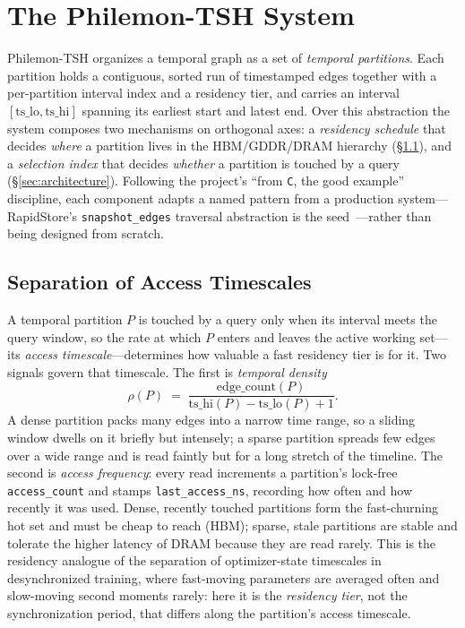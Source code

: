 \documentclass[10pt]{article}
\theoremstyle{definition}
\begin{document}
\section{The Philemon-TSH System}
\label{sec:system}

Philemon-TSH organizes a temporal graph as a set of \emph{temporal partitions}.
Each partition holds a contiguous, sorted run of timestamped edges together with
a per-partition interval index and a residency tier, and carries an interval
$[\mathrm{ts\_lo},\mathrm{ts\_hi}]$ spanning its earliest start and latest end.
Over this abstraction the system composes two mechanisms on orthogonal axes:
a \emph{residency schedule} that decides \emph{where} a partition lives in the
HBM/GDDR/DRAM hierarchy (\S\ref{sec:timescales}), and a \emph{selection index}
that decides \emph{whether} a partition is touched by a query
(\S\ref{sec:architecture}). Following the project's ``from \texttt{C}, the good
example'' discipline, each component adapts a named pattern from a production
system---RapidStore's \texttt{snapshot\_edges} traversal abstraction is the
seed~\citep{rapidstore}---rather than being designed from scratch.

\subsection{Separation of Access Timescales}
\label{sec:timescales}

A temporal partition $P$ is touched by a query only when its interval meets the
query window, so the rate at which $P$ enters and leaves the active working
set---its \emph{access timescale}---determines how valuable a fast residency tier
is for it. Two signals govern that timescale. The first is \emph{temporal
density}
\[
  \rho(P) \;=\; \frac{\text{edge\_count}(P)}{\mathrm{ts\_hi}(P) - \mathrm{ts\_lo}(P) + 1}.
\]
A dense partition packs many edges into a narrow time range, so a sliding window
dwells on it briefly but intensely; a sparse partition spreads few edges over a
wide range and is read faintly but for a long stretch of the timeline. The second
is \emph{access frequency}: every read increments a partition's lock-free
\texttt{access\_count} and stamps \texttt{last\_access\_ns}, recording how often
and how recently it was used. Dense, recently touched partitions form the
fast-churning hot set and must be cheap to reach (HBM); sparse, stale partitions
are stable and tolerate the higher latency of DRAM because they are read rarely.
This is the residency analogue of the separation of optimizer-state timescales in
desynchronized training, where fast-moving parameters are averaged often and
slow-moving second moments rarely: here it is the \emph{residency tier}, not the
synchronization period, that differs along the partition's access timescale.
\end{document}
